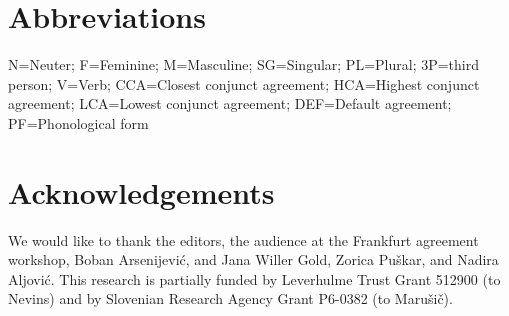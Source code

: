 \documentclass[output=paper
,modfonts
,nonflat]{langsci/langscibook}
\begin{document}
\section*{Abbreviations}
N=Neuter; F=Feminine; M=Masculine; SG=Singular; PL=Plural; 3P=third person; V=Verb; CCA=Closest conjunct agreement; HCA=Highest conjunct agreement; LCA=Lowest conjunct agreement; DEF=Default agreement; PF=Phonological form

\section*{Acknowledgements}
We would like to thank the editors, the audience at the Frankfurt agreement workshop, Boban Arsenijević, and Jana Willer Gold, Zorica Puškar, and Nadira Aljović. This research is partially funded by Leverhulme Trust Grant 512900 (to Nevins) and by Slovenian Research Agency Grant P6-0382 (to Marušič). 

\sloppy
\printbibliography[heading=subbibliography,notkeyword=this]
\end{document}
